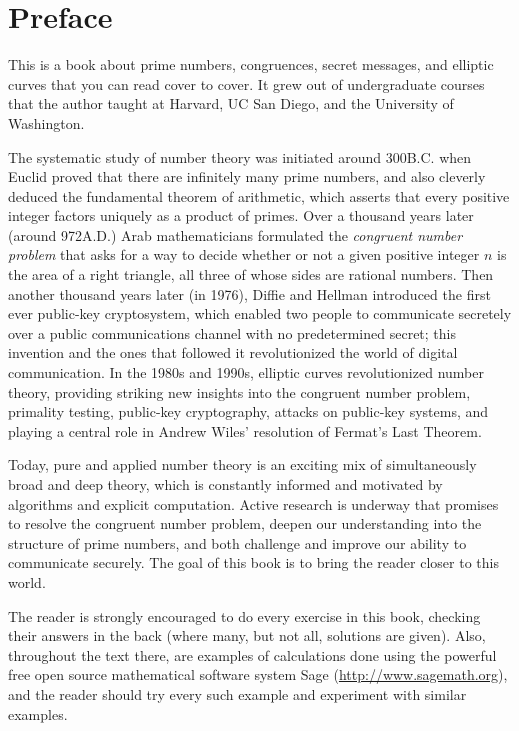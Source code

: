 
\chapter*{Preface}

This is a book about prime numbers, congruences, secret messages, and
elliptic curves that you can read cover to cover.  It grew out of
undergraduate courses that the author taught at Harvard, UC San Diego,
and the University of Washington.

The systematic study of number theory was initiated around 300{\sc B.C.} when
Euclid proved that there are infinitely many prime numbers, and also
cleverly deduced the fundamental theorem of arithmetic, which asserts
that every positive integer factors uniquely as a product of primes.
Over a thousand years later (around 972{\sc A.D.}) Arab mathematicians
formulated the {\em congruent number problem} that asks for a way to
decide whether or not a given positive integer $n$ is the area of a
right triangle, all three of whose sides are rational numbers.  Then
another thousand years later (in 1976), Diffie and Hellman introduced the
first ever public-key cryptosystem, which enabled two people to
communicate secretely over a public communications channel with no
predetermined secret; this invention and the ones that followed it
revolutionized the world of digital communication.  In the 1980s and
1990s, elliptic curves revolutionized number theory, providing
striking new insights into the congruent number problem, primality
testing, public-key cryptography, attacks on public-key systems, and
playing a central role in Andrew Wiles' resolution of Fermat's Last
Theorem.

Today, pure and applied number theory is an exciting mix of
simultaneously broad and deep theory, which is constantly informed and
motivated by algorithms and explicit computation.  Active research is
underway that promises to resolve the congruent number problem, deepen
our understanding into the structure of prime numbers, and both
challenge and improve our ability to communicate securely.  The goal
of this book is to bring the reader closer to this world.

The reader is strongly encouraged to do every exercise in this book,
checking their answers in the back (where many, but not all, solutions
are given).  Also, throughout the text there, are examples of
calculations done using the powerful free open source mathematical
software system Sage (\url{http://www.sagemath.org}), and the reader
should try every such example and experiment with similar examples.

